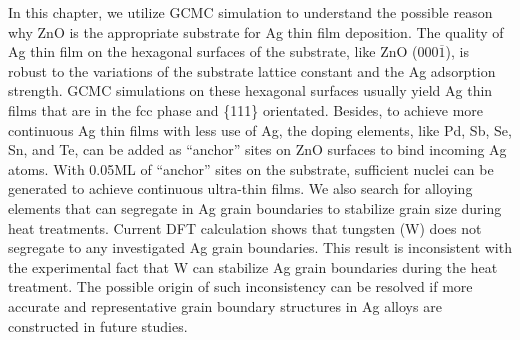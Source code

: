 

In this chapter, we utilize \acf{GCMC} simulation to understand the possible reason why ZnO is the appropriate substrate for Ag thin film deposition. The quality of Ag thin film on the hexagonal surfaces of the substrate, like ZnO (000$\overline{1}$), is robust to the variations of the substrate lattice constant and the Ag adsorption strength. \ac{GCMC} simulations on these hexagonal surfaces usually yield Ag thin films that are in the fcc phase and \{111\} orientated. Besides, to achieve more continuous Ag thin films with less use of Ag, the doping elements, like Pd, Sb, Se, Sn, and Te, can be added as ``anchor'' sites on ZnO surfaces to bind incoming Ag atoms. With 0.05\ac{ML} of ``anchor'' sites on the substrate, sufficient nuclei can be generated to achieve continuous ultra-thin films. We also search for alloying elements that can segregate in Ag grain boundaries to stabilize grain size during heat treatments. Current \ac{DFT} calculation shows that tungsten (W) does not segregate to any investigated Ag grain boundaries. This result is inconsistent with the experimental fact that W can stabilize Ag grain boundaries during the heat treatment. The possible origin of such inconsistency can be resolved if more accurate and representative grain boundary structures in Ag alloys are constructed in future studies.






